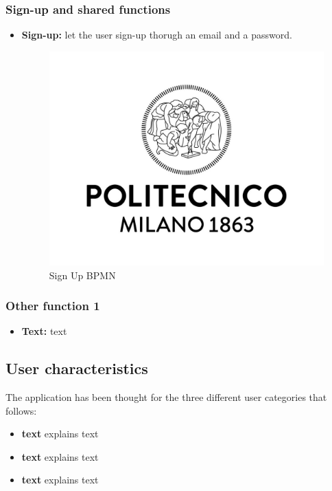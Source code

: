 \documentclass[table, 12pt]{article} %
\begin{document}
        \subsubsection{Sign-up and shared functions}
        \begin{itemize}
            \item \textbf{Sign-up:} let the user sign-up thorugh an email and a password.
            \begin{center}
                \begin{figure}[!h]
                    \includegraphics[width=\textwidth]{assets/logo_polimi.jpg}
                    \caption{Sign Up BPMN}
                    \label{fig: singup}
                \end{figure}
            \end{center}
        \end{itemize}
        
        \subsubsection{Other function 1}
        \begin{itemize}                                 
            \item \textbf{Text:} text
        \end{itemize}
        
        
    \subsection{User characteristics}
    The application has been thought for the three different user categories that follows:
        \begin{itemize}
            \item \textbf{text}  explains text
            \item \textbf{text}  explains text   
            \item \textbf{text}  explains text
        \end{itemize}
\end{document}
